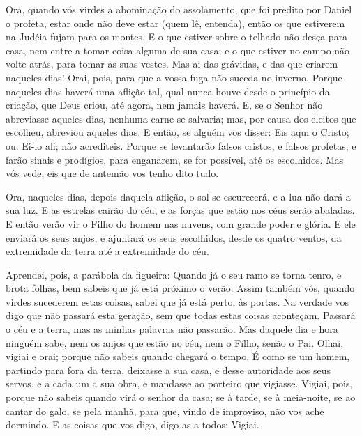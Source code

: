 Ora, quando vós virdes a abominação do assolamento, que foi
predito por Daniel o profeta, estar onde não deve estar (quem lê,
entenda), então os que estiverem na Judéia fujam para os montes.
E o que estiver sobre o telhado não desça para casa, nem
entre a tomar coisa alguma de sua casa; e o que estiver no
campo não volte atrás, para tomar as suas vestes. Mas ai das
grávidas, e das que criarem naqueles dias! Orai, pois, para
que a vossa fuga não suceda no inverno. Porque naqueles dias
haverá uma aflição tal, qual nunca houve desde o princípio da
criação, que Deus criou, até agora, nem jamais haverá. E, se
o Senhor não abreviasse aqueles dias, nenhuma carne se salvaria;
mas, por causa dos eleitos que escolheu, abreviou aqueles dias.
E então, se alguém vos disser: Eis aqui o Cristo; ou: Ei-lo
ali; não acrediteis. Porque se levantarão falsos cristos, e
falsos profetas, e farão sinais e prodígios, para enganarem, se for
possível, até os escolhidos. Mas vós vede; eis que de antemão
vos tenho dito tudo.

Ora, naqueles dias, depois daquela aflição, o sol se escurecerá,
e a lua não dará a sua luz. E as estrelas cairão do céu, e as
forças que estão nos céus serão abaladas. E então verão vir o
Filho do homem nas nuvens, com grande poder e glória. E ele
enviará os seus anjos, e ajuntará os seus escolhidos, desde os
quatro ventos, da extremidade da terra até a extremidade do céu.

Aprendei, pois, a parábola da figueira: Quando já o seu ramo se
torna tenro, e brota folhas, bem sabeis que já está próximo o verão.
Assim também vós, quando virdes sucederem estas coisas, sabei
que já está perto, às portas. Na verdade vos digo que não
passará esta geração, sem que todas estas coisas aconteçam.
Passará o céu e a terra, mas as minhas palavras não passarão.
Mas daquele dia e hora ninguém sabe, nem os anjos que estão
no céu, nem o Filho, senão o Pai. Olhai, vigiai e orai;
porque não sabeis quando chegará o tempo. É como se um homem,
partindo para fora da terra, deixasse a sua casa, e desse autoridade
aos seus servos, e a cada um a sua obra, e mandasse ao porteiro que
vigiasse. Vigiai, pois, porque não sabeis quando virá o
senhor da casa; se à tarde, se à meia-noite, se ao cantar do galo,
se pela manhã, para que, vindo de improviso, não vos ache
dormindo. E as coisas que vos digo, digo-as a todos: Vigiai.

\medskip

